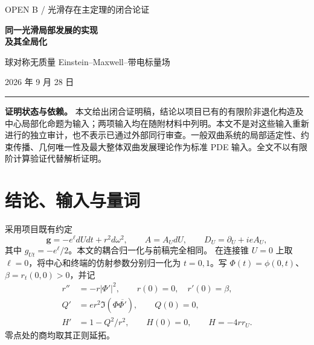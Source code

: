 \begin{titlepage}
\vspace*{1cm}
{\sffamily\large OPEN B / 光滑存在主定理的闭合论证}\par
\vspace{1cm}
{\sffamily\bfseries\LARGE 同一光滑局部发展的实现\\[0.4em]及其全局化}\par
\vspace{0.8cm}
{\large 球对称无质量 Einstein--Maxwell--带电标量场}\par
\vspace{0.8cm}
2026 年 9 月 28 日\par
\vspace{1cm}
\noindent\rule{\textwidth}{0.5pt}
\begin{abstract}
本稿接续有限阶主定理证明和完整非线性中心局部化估计，处理二者之间尚缺的实现与全局化环节。首先核对固定耦合下包含半径、膨胀、电荷及标量横向导数的联合 Jacobian，得到同一份光滑锥种子。随后在一个由低阶范数决定的共同邻域内求解完整 Bondi 系统，证明补充约束及四维中心正则性。通过一次光滑的电真空规范实现、两侧特征发展和全阶接合，构造正半径拼接区域。最后证明适用于非平直中心参考解的顶点填充引理，选取单端渐近平直 Cauchy 面，并识别完整未来零无穷远与最终极端 RN 事件视界。
\end{abstract}
\vfill
\noindent\textbf{证明状态与依赖。} 本文给出闭合证明稿，结论以项目已有的有限阶非退化构造及中心局部化命题为输入；两项输入均在随附材料中列明。本文不是对这些输入重新进行的独立审计，也不表示已通过外部同行审查。一般双曲系统的局部适定性、约束传播、几何唯一性及最大整体双曲发展理论作为标准 PDE 输入。全文不以有限阶计算验证代替解析证明。
\end{titlepage}
\tableofcontents
\clearpage

\section{结论、输入与量词}

采用项目既有约定
\[
\mathbf g=-e^\ell dUdt+r^2d\omega^2,\qquad
A=A_UdU,\qquad D_U=\partial_U+ieA_U,
\]
其中 $g_{Ut}=-e^\ell/2$。本文的耦合归一化与前稿完全相同。
在连接锥 $U=0$ 上取 $\ell=0$，将中心和终端的仿射参数分别归一化为 $t=0,1$。写 $\Phi(t)=\phi(0,t)$、$\beta=r_t(0,0)>0$，并记
\begin{equation}\label{eq:cone}
\begin{split}
r''&=-r|\Phi'|^2,\qquad r(0)=0,\quad r'(0)=\beta,\\
Q'&=er^2\Im(\Phi\overline{\Phi'}),\qquad Q(0)=0,\\
H'&=1-Q^2/r^2,\qquad H(0)=0,\qquad H=-4rr_U.
\end{split}
\end{equation}
零点处的商均取其正则延拓。

